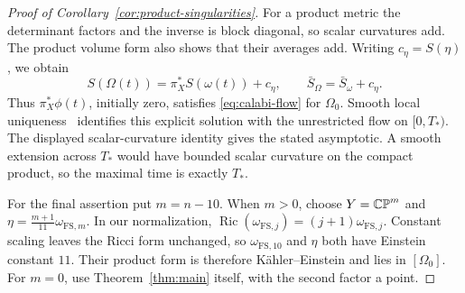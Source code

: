 \begin{proof}[Proof of Corollary~\ref{cor:product-singularities}]
For a product metric the determinant factors and the inverse is block
diagonal, so scalar curvatures add.  The product volume form also shows
that their averages add.  Writing \(c_\eta=S(\eta)\), we obtain
\[
 S(\Omega(t))=\pi_X^*S(\omega(t))+c_\eta,
 \qquad \bar S_\Omega=\bar S_\omega+c_\eta.
\]
Thus \(\pi_X^*\phi(t)\), initially zero, satisfies
\eqref{eq:calabi-flow} for \(\Omega_0\).  Smooth local
uniqueness~\cite[Theorem~3.2]{ChenHe2008} identifies this explicit
solution with the unrestricted flow on \([0,T_*)\).  The displayed
scalar-curvature identity gives the stated asymptotic.  A smooth
extension across \(T_*\) would have bounded scalar curvature on the
compact product, so the maximal time is exactly \(T_*\).

For the final assertion put \(m=n-10\).  When \(m>0\), choose
\(Y=\mathbb{CP}^m\) and \(\eta=\frac{m+1}{11}\omega_{\mathrm{FS},m}\).
In our normalization,
\(\operatorname{Ric}(\omega_{\mathrm{FS},j})
=(j+1)\omega_{\mathrm{FS},j}\).  Constant scaling leaves the Ricci
form unchanged, so \(\omega_{\mathrm{FS},10}\) and \(\eta\) both
have Einstein constant \(11\).  Their product form is therefore
K\"ahler--Einstein and lies in \([\Omega_0]\).
For \(m=0\), use Theorem~\ref{thm:main} itself, with the second
factor a point.
\end{proof}
